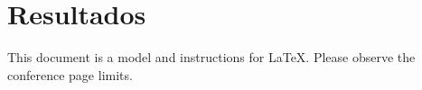 \section{Resultados}
This document is a model and instructions for \LaTeX.
Please observe the conference page limits. 